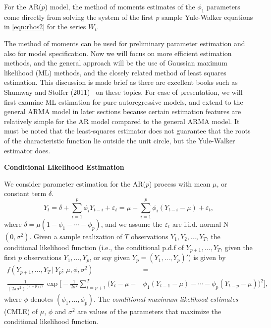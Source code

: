 \begin{ex}[AR($p$) Model]
 For the AR($p$) model, the method of moments estimates of the $\phi_1$ parameters come directly from solving the system of the first $p$ sample Yule-Walker equations in \eqref{eqn:rhos2} for the series $W_t$. \xqed
\end{ex}


The method of moments can be used for preliminary parameter estimation and also for model specification. Now we will focus on more efficient estimation methods, and the general approach will be the use of Gaussian maximum likelihood (ML) methods, and the closely related method of least squares estimation. This discussion is made brief as there are excellent books such as Shumway and Stoffer (2011)~\cite{shumway2011arima} on these topics. For ease of presentation, we will first examine ML estimation for pure autoregressive models, and extend to the general ARMA model in later sections because certain estimation features are relatively simple for the AR model compared to the general ARMA model. It must be noted that the least-squares estimator does not guarantee that the roots of the characteristic function lie outside the unit circle, but the Yule-Walker estimator does. \twomedskip


\noindent\textbf{Conditional Likelihood Estimation} \twomedskip


We consider parameter estimation for the AR($p$) process with mean $\mu$, or constant term $\delta$.
	\begin{equation} \label{eqn:ytseqagain}
	Y_t = \delta + \sum_{i=1}^p \phi_i Y_{t-i} + \varepsilon_t= \mu + \sum_{i=1}^p \phi_i (Y_{t-i} - \mu) + \varepsilon_t,
	\end{equation}
where $\delta = \mu(1 - \phi_1 - \cdots - \phi_p)$, and we assume the $\varepsilon_t$ are i.i.d. normal N$(0, \sigma^2)$. Given a sample realization of $T$ observations $Y_1, Y_2, \ldots, Y_T$, the conditional likelihood function (i.e., the conditional p.d.f of $Y_{p+1}, \ldots, Y_T$, given the first $p$ observations $Y_1, \ldots, Y_p$, or say given $Y_p = (Y_1, \ldots, Y_p)'$) is given by
	\[
	\begin{split}
	f(Y_{p+1}, \ldots,Y_T \,|\, Y_p;\, \mu, \phi, \sigma^2)&= \\ 
	\frac{1}{(2\pi\sigma^2)^{(T-p)/2}}\, \exp\bigg[-\frac{1}{2\sigma^2}\sum_{t=p+1}^T \big(Y_t - \mu - &\phi_1(Y_{t-1} - \mu) - \cdots  - \phi_p(Y_{t-p} - \mu) \big)^2 \bigg],
	\end{split}
	\]
where $\phi$ denotes $(\phi_1,\ldots,\phi_p)$. The \emph{conditional maximum likelihood estimates} (CMLE) of $\mu$, $\phi$ and $\sigma^2$ are values of the parameters that maximize the conditional likelihood function.



